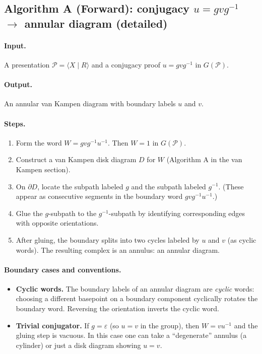 \documentclass[11pt]{article}
\theoremstyle{definition}
\theoremstyle{plain}
\theoremstyle{remark}
\begin{document}
\subsection*{Algorithm A (Forward): conjugacy $u=gvg^{-1}$ $\to$ annular diagram (detailed)}\cite{lyndonschupp1977}
\paragraph{Input.} A presentation $\mathcal P=\langle X\mid R\rangle$ and a conjugacy proof $u=gvg^{-1}$ in $G(\mathcal P)$.
\paragraph{Output.} An annular van Kampen diagram with boundary labels $u$ and $v$.

\paragraph{Steps.}
\begin{enumerate}[leftmargin=2.2em]
\item Form the word $W=gvg^{-1}u^{-1}$.
Then $W=1$ in $G(\mathcal P)$.
\item Construct a van Kampen disk diagram $D$ for $W$ (Algorithm A in the van Kampen section).
\item On $\partial D$, locate the subpath labeled $g$ and the subpath labeled $g^{-1}$.
(These appear as consecutive segments in the boundary word $gvg^{-1}u^{-1}$.)
\item Glue the $g$-subpath to the $g^{-1}$-subpath by identifying corresponding edges with opposite orientations.
\item After gluing, the boundary splits into two cycles labeled by $u$ and $v$ (as cyclic words).
The resulting complex is an annulus: an annular diagram.
\end{enumerate}

\paragraph{Boundary cases and conventions.}
\begin{itemize}[leftmargin=2em]
\item \textbf{Cyclic words.} The boundary labels of an annular diagram are \emph{cyclic} words: choosing a different basepoint on a boundary component cyclically rotates the boundary word. Reversing the orientation inverts the cyclic word.
\item \textbf{Trivial conjugator.} If $g=\varepsilon$ (so $u=v$ in the group), then $W=vu^{-1}$ and the gluing step is vacuous. In this case one can take a ``degenerate'' annulus (a cylinder) or just a disk diagram showing $u=v$.
\end{itemize}
\end{document}
